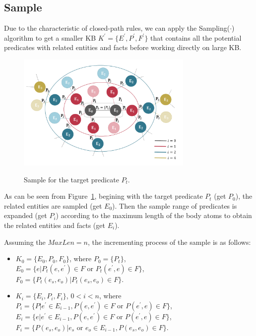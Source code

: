 \documentclass{article}
\begin{document}
	\subsection{Sample}  
	Due to the characteristic of closed-path rules, we can apply the \textsf{Sampling($\cdot$)} algorithm to get a smaller KB $K^{'}=\{E^{'}, P^{'}, F^{'}\}$ that contains all the potential predicates with related entities and facts before working directly on large KB. 
	\begin{figure}
		\centering
		\includegraphics[width=85mm]{sample.pdf}\\
		\caption{Sample for the target predicate $P_t$.}
		\label{fig:sample}
	\end{figure}
	
	As can be seen from Figure~\ref{fig:sample}, begining with the target predicate $P_t$ (get $P_0$), the related entities are sampled (get $E_0$). Then the sample range of predicates is expanded (get $P_i$) according to the maximum length of the body atoms to obtain the related entities and facts (get $E_i$). 
	
	Assuming the $MaxLen = n$, the incrementing process of the sample is as follows:
	\begin{itemize}
		\item $K_0=\{E_0, P_0, F_0\}$, where $P_0=\{P_t\}$, \\
		$E_0=\{e | P_t(e, e^{'}) \in F$ or $P_t(e^{'}, e) \in F\}$, \\
		$F_0=\{P_t(e_s,e_o) | P_t(e_s,e_o) \in F \}$.
		\item $K_i=\{E_i, P_i, F_i\}$, $0<i<n$, where \\
		$P_i=\{P|e^{'} \in E_{i-1}, P(e, e^{'})\in F$ or $P(e^{'},e)\in F\}$,\\
		$E_i=\{e|e^{'} \in E_{i-1}, P(e, e^{'})\in F$ or $P(e^{'},e)\in F\}$,\\
		$F_i=\{P(e_s, e_o)|e_s$ or $ e_o \in E_{i-1}, P(e_s, e_o)\in F\}$.
	\end{itemize}
	
\end{document}
